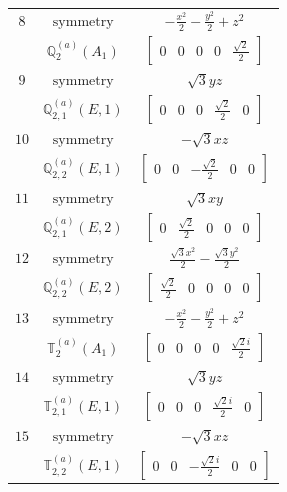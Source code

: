 \documentclass[fleqn,8pt,landscape]{jsarticle}
\begin{document}
\begin{longtable}{ccc}
$ 8 $ & $ \text{symmetry} $ & $ - \frac{x^{2}}{2} - \frac{y^{2}}{2} + z^{2} $ \\
$  $ & $ \mathbb{Q}_{2}^{(a)}(A_{1}) $ & $ \begin{bmatrix} 0 & 0 & 0 & 0 & \frac{\sqrt{2}}{2} \end{bmatrix} $ \\ \hline
$ 9 $ & $ \text{symmetry} $ & $ \sqrt{3} y z $ \\
$  $ & $ \mathbb{Q}_{2,1}^{(a)}(E,1) $ & $ \begin{bmatrix} 0 & 0 & 0 & \frac{\sqrt{2}}{2} & 0 \end{bmatrix} $ \\ \hline
$ 10 $ & $ \text{symmetry} $ & $ - \sqrt{3} x z $ \\
$  $ & $ \mathbb{Q}_{2,2}^{(a)}(E,1) $ & $ \begin{bmatrix} 0 & 0 & - \frac{\sqrt{2}}{2} & 0 & 0 \end{bmatrix} $ \\ \hline
$ 11 $ & $ \text{symmetry} $ & $ \sqrt{3} x y $ \\
$  $ & $ \mathbb{Q}_{2,1}^{(a)}(E,2) $ & $ \begin{bmatrix} 0 & \frac{\sqrt{2}}{2} & 0 & 0 & 0 \end{bmatrix} $ \\ \hline
$ 12 $ & $ \text{symmetry} $ & $ \frac{\sqrt{3} x^{2}}{2} - \frac{\sqrt{3} y^{2}}{2} $ \\
$  $ & $ \mathbb{Q}_{2,2}^{(a)}(E,2) $ & $ \begin{bmatrix} \frac{\sqrt{2}}{2} & 0 & 0 & 0 & 0 \end{bmatrix} $ \\ \hline
$ 13 $ & $ \text{symmetry} $ & $ - \frac{x^{2}}{2} - \frac{y^{2}}{2} + z^{2} $ \\
$  $ & $ \mathbb{T}_{2}^{(a)}(A_{1}) $ & $ \begin{bmatrix} 0 & 0 & 0 & 0 & \frac{\sqrt{2} i}{2} \end{bmatrix} $ \\ \hline
$ 14 $ & $ \text{symmetry} $ & $ \sqrt{3} y z $ \\
$  $ & $ \mathbb{T}_{2,1}^{(a)}(E,1) $ & $ \begin{bmatrix} 0 & 0 & 0 & \frac{\sqrt{2} i}{2} & 0 \end{bmatrix} $ \\ \hline
$ 15 $ & $ \text{symmetry} $ & $ - \sqrt{3} x z $ \\
$  $ & $ \mathbb{T}_{2,2}^{(a)}(E,1) $ & $ \begin{bmatrix} 0 & 0 & - \frac{\sqrt{2} i}{2} & 0 & 0 \end{bmatrix} $ \\ \hline

\end{longtable}
\end{document}
